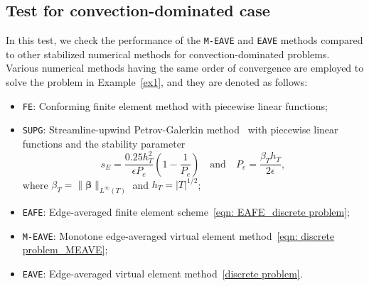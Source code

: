 \documentclass[a4paper]{article}
\theoremstyle{plain}
\theoremstyle{definition}
\numberwithin{equation}{section}
\begin{document}
\subsection{Test for convection-dominated case}

In this test, we check the performance of the \texttt{M-EAVE} and \texttt{EAVE} methods compared to other stabilized numerical methods for convection-dominated problems.
Various numerical methods having the same order of convergence are employed to solve the problem in Example~\ref{ex1}, and they are denoted as follows:
\begin{itemize}
    \item \texttt{FE}: Conforming finite element method with piecewise linear functions;
    \item \texttt{SUPG}: Streamline-upwind Petrov-Galerkin method~\cite{BRO82} with piecewise linear functions and the stability parameter
    $$s_E=\frac{0.25h^2_T}{\epsilon P_e}\left(1-\frac{1}{P_e}\right)\quad\text{and}\quad P_e=\frac{\beta_Th_T}{2\epsilon},$$
    where $\beta_T=\|\bm{\beta}\|_{L^\infty(T)}$ and $h_T=|T|^{1/2}$;
    \item \texttt{EAFE}: Edge-averaged finite element scheme~\eqref{eqn: EAFE_discrete problem};
    \item \texttt{M-EAVE}: Monotone edge-averaged virtual element method~\eqref{eqn: discrete problem_MEAVE};
    \item \texttt{EAVE}: Edge-averaged virtual element method~\eqref{discrete problem}.
\end{itemize}
\end{document}
